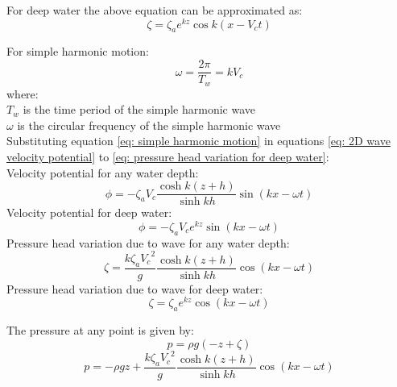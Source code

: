 For deep water the above equation can be approximated as:
\begin{equation}
  \zeta = \zeta_a e^{k z} \cos k(x - V_c t)
  \label{eq: pressure head variation for deep water}
\end{equation}

For simple harmonic motion: 
\begin{equation}
  \omega = \frac{2 \pi}{T_w} = k V_c
  \label{eq: simple harmonic motion}
\end{equation}
where: \\
$T_w$ is the time period of the simple harmonic wave\\
$\omega$ is the circular frequency of the simple harmonic wave\\

Substituting equation \ref{eq: simple harmonic motion} in equations  
\ref{eq: 2D wave velocity potential} to
\ref{eq: pressure head variation for deep water}:\\
Velocity potential for any water depth: 
\begin{equation}
  \phi = - \zeta_a V_c \frac{\cosh k(z + h)}{\sinh k h} \sin (kx - \omega t)
  \label {eq: 2D wave velocity potential wrt frequency}
\end{equation}
Velocity potential for deep water: 
\begin{equation}
  \phi = - \zeta_a V_c e^{k z} \sin (k x - \omega t)
  \label {eq: 2D wave velocity potential wrt frequency deep water}
\end{equation}
Pressure head variation due to wave for any water depth:
\begin{equation}
  \zeta = \frac{k \zeta_a {V_c}^2}{g} \frac{\cosh k(z + h)}{\sinh kh} \cos (kx
  - \omega t)
  \label{eq: pressure head variation wrt frequency}
\end{equation}
Pressure head variation due to wave for deep water:
\begin{equation}
  \zeta = \zeta_a e^{k z} \cos (k x - \omega t)
  \label{eq: pressure head variation wrt frequency deep water}
\end{equation}

The pressure at any point is given by:
\begin{equation}
  p = \rho g (-z + \zeta)
\end{equation}
\begin{equation}
  p = - \rho g z + \frac{k \zeta_a {V_c}^2}{g} \frac{\cosh k(z + h)}{\sinh k h} 
  \cos (kx - \omega t)
  \label{eq: pressure variation}
\end{equation}

